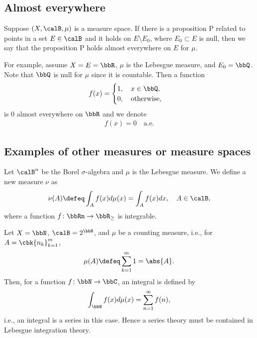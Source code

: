 \documentclass[openany, a4paper, oneside]{jsbook}
\begin{document}
\subsection{Almost everywhere}

Suppose $(X, \calB, \mu)$ is a measure space.
If there is a proposition P related to points in a set $E \in \calB$
and it holds on $E \setminus E_0$, where $E_0 \subset E$ is null,
then we say that the proposition P holds almost everywhere on $E$ for $\mu$.

For example, assume $X = E = \bbR$, $\mu$ is the Lebesgue measure, and $E_0 = \bbQ$.
Note that $\bbQ$ is null for $\mu$ since it is countable.
Then a function
\begin{align}
 f (x)
 =
 \begin{cases}
 1, \quad x \in \bbQ, \\
 0, \quad \text{otherwise},
 \end{cases}
\end{align}
is $0$ almost everywhere on $\bbR$ and we denote
\begin{align}
 f (x) = 0 \quad \text{a.e.}
\end{align}
\subsection{Examples of other measures or measure spaces}

\begin{ex}
 Let $\calB^n$ be the Borel $\sigma$-algebra and $\mu$ is the Lebesgue measure.
 We define a new measure $\nu$ as
 \begin{align}
  \nu (A)
  \defeq
  \int_A f (x) d \mu (x)
  =
  \int_A f (x) dx, \quad A \in \calB,
 \end{align}
 where a function $f \colon \bbRn \to \bbR_{\geq}$ is integrable.
\end{ex}
\begin{ex}
 Let $X = \bbN$, $\calB = 2^{\bbN}$, and $\mu$ be a counting measure, i.e., for $A = \cbk{n_k}_{k=1}^m$,
 \begin{align}
  \mu (A)
  \defeq
  \sum_{k=1}^m 1
  =
  \abs{A}.
 \end{align}
 Then, for a function $f \colon \bbN \to \bbC$, an integral is defined by
 \begin{align}
  \int_{\bbN} f (x) d \mu (x)
  =
  \sum_{n=1}^{\infty} f (n),
 \end{align}
 i.e., an integral is a series in this case.
 Hence a series theory must be contained in Lebesgue integration theory.
\end{ex}
\end{document}
